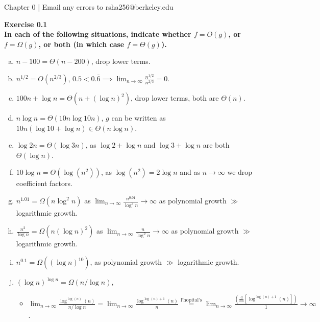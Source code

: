 \documentclass{article}
\newenvironment{problem}[2][Exercise]
    { \begin{mdframed}[backgroundcolor=gray!20] \textbf{#1 #2} \\}
    {  \end{mdframed}}
\begin{document}
\begin{mdframed}[backgroundcolor=blue!20]
Chapter 0 | Email any errors to rsha256@berkeley.edu
\end{mdframed}

\begin{problem}{0.1}
    \textbf{In each of the following situations, indicate whether $f = O(g)$, or $f =\Omega(g)$, or both (in which case $f = \Theta(g)$).}
    
    \begin{enumerate}[(a)]
        \item $n-100=\Theta(n-200)$, drop lower terms.
        \item $n^{1/2}= O(n^{2/3})$, $0.5 < 0.\bar 6\implies\displaystyle\lim_{n\to\infty}\frac{n^{1/2}}{n^{2/3}}=0$.
        \item $100n+\log{n}=\Theta(n+(\log{n})^2)$, drop lower terms, both are $\Theta(n)$.
        \item $n\log n=\Theta(10n\log 10n)$, $g$ can be written as $10n(\log10+\log n)\in\Theta(n\log n)$.
        \item $\log 2n=\Theta(\log 3n)$, as $\log 2+\log n$ and $\log 3+\log n$ are both $\Theta(\log n)$.
        \item $10\log n=\Theta(\log(n^2))$, as $\log(n^2)=2\log n$ and as $n\to\infty$ we drop coefficient factors.
        \item $n^{1.01}=\Omega(n\log^2 n)$ as $\displaystyle\lim_{n\to\infty}\frac{n^{0.01}}{\log^2 n}\to\infty$ as polynomial growth $\gg$ logarithmic growth.
        \item $\frac{n^2}{\log n}=\Omega(n(\log n)^2)$ as $\displaystyle\lim_{n\to\infty}\frac{n}{\log^2 n}\to\infty$ as polynomial growth $\gg$ logarithmic growth.
        \item $n^{0.1}=\Omega((\log n)^{10})$, as polynomial growth $\gg$ logarithmic growth.
        \item $(\log n)^{\log n}=\Omega(n/\log n)$, 
            \begin{itemize}
                \item $\displaystyle\lim_{n\to\infty} \frac{\log^{\log(n)}(n)}{n/\log{n}}
                =\lim_{n\to\infty} \frac{\log^{\log(n)+1}(n)}{n}
                \stackrel{\text{l'hopital's}}{=}\lim_{n\to\infty}\frac{\left(\frac{\mathrm d}{\mathrm{d}n}\left[\log^{\log(n)+1}(n)\right]\right)}{1}
                \to\infty$.
            \end{itemize}

\end{enumerate}
\end{problem}
\end{document}
